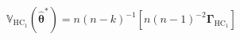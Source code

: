 \begin{equation}
	\mathbb{V}_{
		\mathrm{HC}_{1}
	}
	\left(
	\hat{
		\boldsymbol{\theta}
		}^{\ast}
	\right)
	=
	n
	\left(
	n - k
	\right)^{-1}
	\left[
		n
		\left(
		n - 1
		\right)^{-2}
		\boldsymbol{\Gamma}_{
			\mathrm{HC}_{1}
		}
	\right]
\end{equation}
